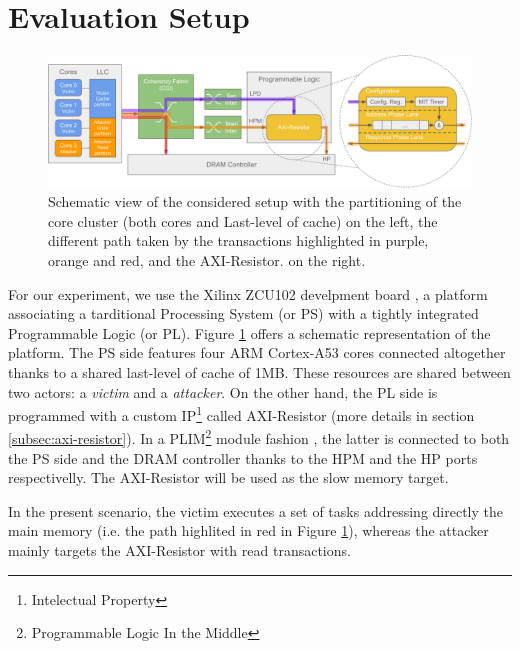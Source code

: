 \section{Evaluation Setup}
    \label{sec:evaluation_setup}
    \begin{figure}
        \centering
        \includegraphics[scale=0.56]{images/Evaluation_setup.pdf}
        \caption{Schematic view of the considered setup with the partitioning of the core cluster (both cores and Last-level of cache) on the left, the different path taken by the transactions highlighted in purple, orange and red, and the AXI-Resistor. on the right.}
        \label{fig:system_schematic}
    \end{figure}
    For our experiment, we use the Xilinx ZCU102 develpment board \cite{Xilinx-ULTRASCALE-TRM}, a platform associating a tarditional Processing System (or PS) with a tightly integrated Programmable Logic (or PL). Figure \ref{fig:system_schematic} offers a schematic representation of the platform.
    The PS side features four ARM Cortex-A53 cores \cite{ARM-cortex-A53} connected altogether thanks to a shared last-level of cache of 1MB. These resources are shared between two actors: a \emph{victim} and a \emph{attacker}. On the other hand, the PL side is programmed with a custom IP\footnote{Intelectual Property} called AXI-Resistor (more details in section \ref{subsec:axi-resistor}). In a PLIM\footnote{Programmable Logic In the Middle} module fashion \cite{PLIM20}, the latter is connected to both the PS side and the DRAM controller thanks to the HPM and the HP ports respectivelly. The AXI-Resistor will be used as the slow memory target.

    In the present scenario, the victim executes a set of tasks addressing directly the main memory (i.e. the path highlited in red in Figure \ref{fig:system_schematic}), whereas the attacker mainly targets the AXI-Resistor with read transactions.\\

